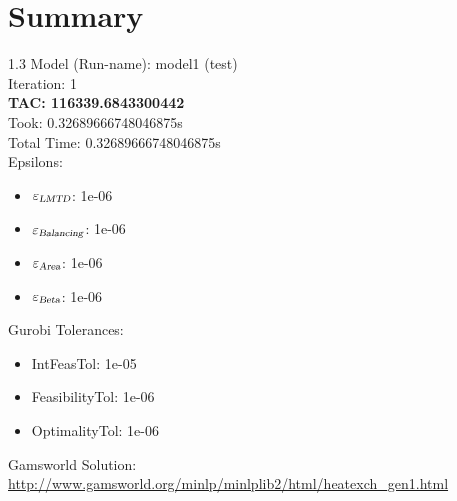 \documentclass{article}%
\begin{document}
%
\normalsize%
\section{Summary}%
\thispagestyle{plain}%
\begin{spacing}{1.3}%
\Large%
Model (Run-name): model1 (test)\\%
Iteration: 1\\%
\textbf{TAC: 116339.6843300442}\\%
Took: 0.32689666748046875s\\%
Total Time: 0.32689666748046875s\\%
Epsilons:%
\begin{itemize}%
	\item $\varepsilon_{\textsl{LMTD}}$: 1e-06%
	\item $\varepsilon_{\textsl{Balancing}}$: 1e-06%
	\item $\varepsilon_{\textsl{Area}}$: 1e-06%
	\item $\varepsilon_{\textsl{Beta}}$: 1e-06%
\end{itemize}%
Gurobi Tolerances:%
\begin{itemize}%
	\item IntFeasTol: 1e-05%
	\item FeasibilityTol: 1e-06%
	\item OptimalityTol: 1e-06%
\end{itemize}%
\end{spacing}%
\normalsize%
Gamsworld Solution: \url{http://www.gamsworld.org/minlp/minlplib2/html/heatexch_gen1.html}%
%
\clearpage%
\end{document}
